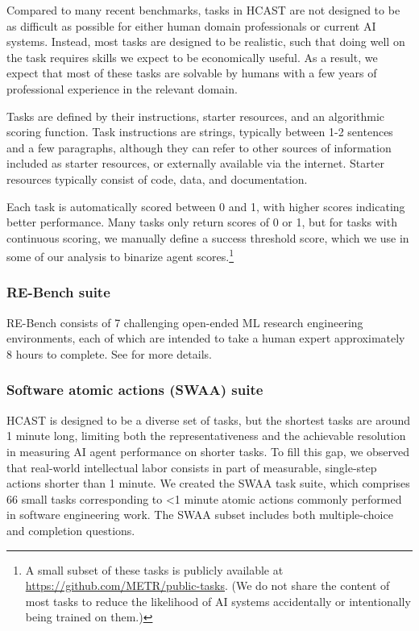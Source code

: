\documentclass{article}
\newcommand{\gabenchmark}{HCAST}
\begin{document}
Compared to many recent benchmarks, tasks in \gabenchmark{} are not designed to be as difficult as possible for either human domain professionals or current AI systems. Instead, most tasks are designed to be realistic, such that doing well on the task requires skills we expect to be economically useful. As a result, we expect that most of these tasks are solvable by humans with a few years of professional experience in the relevant domain. 

Tasks are defined by their instructions, starter resources, and an algorithmic scoring function. Task instructions are strings, typically between 1-2 sentences and a few paragraphs, although they can refer to other sources of information included as starter resources, or externally available via the internet. Starter resources typically consist of code, data, and documentation.

Each task is automatically scored between 0 and 1, with higher scores indicating better performance. Many tasks only return scores of 0 or 1, but for tasks with continuous scoring, we manually define a success threshold score, which we use in some of our analysis to binarize agent scores.\footnote{A small subset of these tasks {is publicly available} at \url{https://github.com/METR/public-tasks}. 
(We do not share the content of most tasks to reduce the likelihood of AI systems accidentally or intentionally being trained on them.)}

\subsubsection{RE-Bench suite}
RE-Bench consists of 7 challenging open-ended ML research engineering environments, each of which are intended to take a human expert approximately 8 hours to complete. See \citet{wijk2024re} for more details. 

\subsubsection{Software atomic actions (SWAA) suite}\label{sec:swaa}
\gabenchmark{} is designed to be a diverse set of tasks, but the shortest tasks are around 1 minute long, limiting both the representativeness and the achievable resolution in measuring AI agent performance on shorter tasks. To fill this gap, we observed that real-world intellectual labor consists in part of measurable, single-step actions shorter than 1 minute. We created the SWAA task suite, which comprises 66 small tasks corresponding to \textless1 minute atomic actions commonly performed in software engineering work. The SWAA subset includes both multiple-choice and completion questions. 
\end{document}
